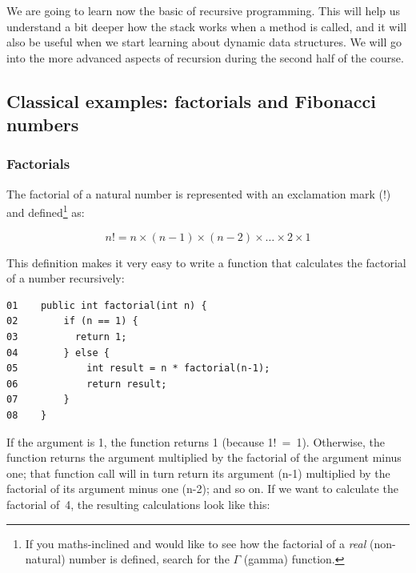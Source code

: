 We are going to learn now the basic of recursive programming. This
will help us understand a bit deeper how the stack works when a method
is called, and it will also be useful when we start learning about
dynamic data structures. We will go into the more advanced aspects of
recursion during the second half of the course. 

\subsection{Classical examples: factorials and Fibonacci numbers}
\label{sec:class-exampl-fact}

\subsubsection{Factorials}

The factorial of a natural number is represented with an exclamation
mark (!) and defined\footnote{If you maths-inclined and would like to see
  how the factorial of a \emph{real} (non-natural) number is defined, search for the
  $\Gamma$ (gamma) function.} as:  

$$ n! = n \times (n - 1) \times (n - 2) \times \ldots \times 2 \times 1 $$

This definition makes it very easy to write a function that calculates
the factorial of a number recursively: 

\begin{verbatim}
01    public int factorial(int n) {
02        if (n == 1) {
03          return 1; 
04        } else {
05            int result = n * factorial(n-1);
06            return result;
07        }
08    }
\end{verbatim}

If the argument is 1, the function returns 1 (because 
\mbox{1! = 1).} 
Otherwise, the function returns the argument multiplied by the
factorial of the argument minus one; that function call will in turn
return its argument (n-1) multiplied by the factorial of its argument
minus one (n-2); and so on. If we want to calculate the factorial
of~4, the resulting calculations look like this: 

